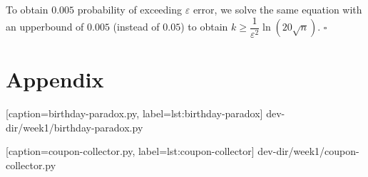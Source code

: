 \documentclass{article}
\begin{document}
\begin{enumerate}[leftmargin={*}, font={\bf}, label={\arabic*.}, ref={\arabic*}]
    To obtain $0.005$ probability of exceeding $\varepsilon$ error, we solve the same equation
    with an upperbound of $0.005$ (instead of $0.05$) to obtain $k \geq \dfrac{1}{\varepsilon^2}
    \ln \left(20\sqrt{n}\right)$. \hfill $\square$
  \end{enumerate}
  
  \newpage

  \section*{Appendix}
  
  
    [caption={\sf birthday-paradox.py}, label={lst:birthday-paradox}]
    {dev-dir/week1/birthday-paradox.py}
    
  \newpage

  
    [caption={\sf coupon-collector.py}, label={lst:coupon-collector}]
    {dev-dir/week1/coupon-collector.py}
\end{document}
